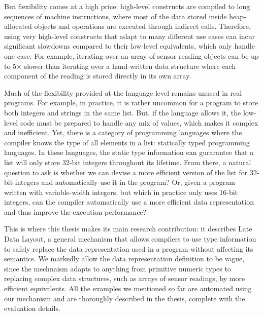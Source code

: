 But flexibility comes at a high price: high-level constructs are compiled to long sequences of machine instructions, where most of the data stored inside heap-allocated objects and operations are executed through indirect calls. Therefore, using very high-level constructs that adapt to many different use cases can incur significant slowdowns compared to their low-level equivalents, which only handle one case. For example, iterating over an array of sensor reading objects can be up to 5$\times$ slower than iterating over a hand-written data structure where each component of the reading is stored directly in its own array.

Much of the flexibility provided at the language level remains unused in real programs. For example, in practice, it is rather uncommon for a program to store both integers and strings in the same list. But, if the language allows it, the low-level code must be prepared to handle any mix of values, which makes it complex and inefficient. Yet, there is a category of programming languages where the compiler knows the type of all elements in a list: statically typed programming languages. In these languages, the static type information can gurarantee that a list will only store 32-bit integers throughout its lifetime. From there, a natural question to ask is whether we can devise a more efficient version of the list for 32-bit integers and automatically use it in the program? Or, given a program written with variable-width integers, but which in practice only uses 16-bit integers, can the compiler automatically use a more efficient data representation and thus improve the execution performance?

This is where this thesis makes its main research contribution: it describes Late Data Layout, a general mechanism that allows compilers to use type information to safely replace the data representation used in a program without affecting its semantics. We markedly allow the data representation definition to be vague, since the mechnaism adapts to anything from primitive numeric types to replacing complex data structures, such as arrays of sensor readings, by more efficient equivalents. All the examples we mentioned so far are automated using our mechanism and are thoroughly described in the thesis, complete with the evaluation details. %

